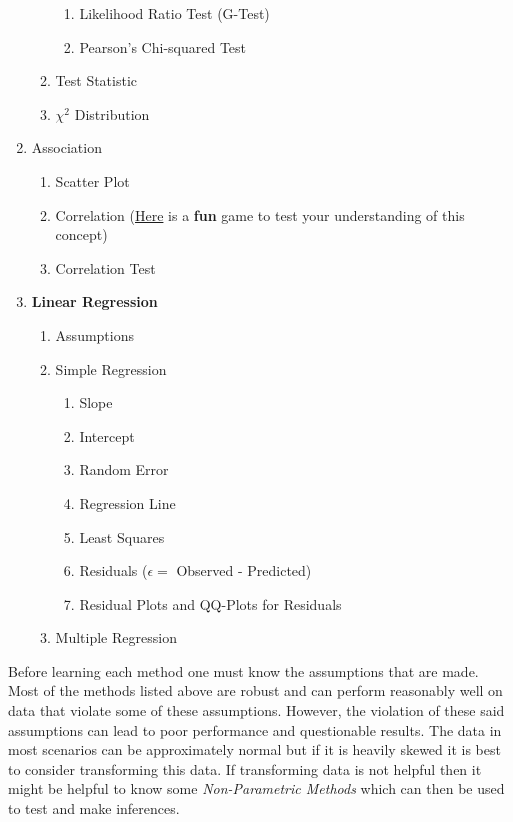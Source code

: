 \documentclass[11pt]{article}
\begin{document}
\begin{enumerate}
\begin{enumerate}
\begin{enumerate}
				\item Likelihood Ratio Test (G-Test)
				\item Pearson's Chi-squared Test
			\end{enumerate}
			\item Test Statistic
			\item $\chi^2$ Distribution
		\end{enumerate}
		\item Association
		\begin{enumerate}
			\item Scatter Plot
			\item Correlation (\href{http://guessthecorrelation.com/}{Here} is a \textbf{fun} game to test your understanding of this concept)
			\item Correlation Test
		\end{enumerate}
		\item \textbf{Linear Regression}
		\begin{enumerate}
			\item Assumptions
			\item Simple Regression
			\begin{enumerate}
				\item Slope
				\item Intercept
				\item Random Error
				\item Regression Line
				\item Least Squares
				\item Residuals ($\epsilon = $ Observed - Predicted)
				\item Residual Plots and QQ-Plots for Residuals
			\end{enumerate}
			\item Multiple Regression
		\end{enumerate}
	\end{enumerate}
	Before learning each method one must know the assumptions that are made. Most of the methods listed above are robust and can perform reasonably well on data that violate some of these assumptions. However, the violation of these said assumptions can lead to poor performance and questionable results. The data in most scenarios can be approximately normal but if it is heavily skewed it is best to consider transforming this data. If transforming data is not helpful then it might be helpful to know some \textit{Non-Parametric Methods} which can then be used to test and make inferences.
\end{document}
